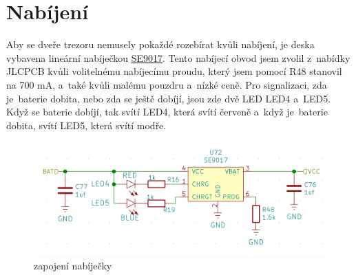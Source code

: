 \section{Nabíjení}

Aby se dveře trezoru nemusely pokaždé rozebírat kvůli nabíjení, je deska vybavena lineární nabíječkou 
\href{https://datasheet.lcsc.com/szlcsc/Seaward-Elec-SE9017-HF_C115752.pdf}{SE9017}. 
Tento nabíjecí obvod jsem zvolil z~nabídky JLCPCB kvůli volitelnému nabíjecímu proudu, který jsem pomocí R48 stanovil na 700 mA, a~také kvůli malému 
pouzdru a~nízké ceně.
Pro signalizaci, zda je~baterie dobita, nebo zda se ještě dobíjí, jsou zde dvě LED LED4 a~LED5. Když se baterie dobíjí, tak svítí LED4, která svítí 
červeně a~když je~baterie dobita, svítí LED5, která svítí modře.

\begin{figure}[htbp]
    \centering
    \includegraphics[width=\textwidth]{kapitoly/obrazky/E4/nabijeni/nabijecka.png}
    \caption{zapojení nabíječky}
    \label{fig:E4-step-up}
\end{figure}

\newpage
